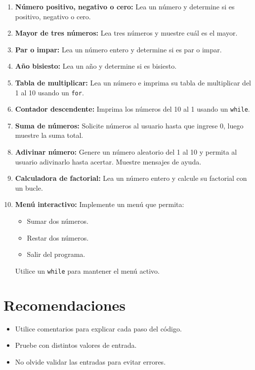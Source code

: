 \documentclass[12pt,a4paper]{article}
\begin{document}
\begin{enumerate}[label=\textbf{Ejercicio \arabic*:}, leftmargin=1.5cm]
    \item \textbf{Número positivo, negativo o cero:} Lea un número y determine si es positivo, negativo o cero.
    
    \item \textbf{Mayor de tres números:} Lea tres números y muestre cuál es el mayor.
    
    \item \textbf{Par o impar:} Lea un número entero y determine si es par o impar.
    
    \item \textbf{Año bisiesto:} Lea un año y determine si es bisiesto.
    
    \item \textbf{Tabla de multiplicar:} Lea un número e imprima su tabla de multiplicar del 1 al 10 usando un \texttt{for}.
    
    \item \textbf{Contador descendente:} Imprima los números del 10 al 1 usando un \texttt{while}.
    
    \item \textbf{Suma de números:} Solicite números al usuario hasta que ingrese 0, luego muestre la suma total.
    
    \item \textbf{Adivinar número:} Genere un número aleatorio del 1 al 10 y permita al usuario adivinarlo hasta acertar. Muestre mensajes de ayuda.
    
    \item \textbf{Calculadora de factorial:} Lea un número entero y calcule su factorial con un bucle.
    
    \item \textbf{Menú interactivo:} Implemente un menú que permita:
    \begin{itemize}
        \item Sumar dos números.
        \item Restar dos números.
        \item Salir del programa.
    \end{itemize}
    Utilice un \texttt{while} para mantener el menú activo.
\end{enumerate}

\section*{Recomendaciones}
\begin{itemize}
    \item Utilice comentarios para explicar cada paso del código.
    \item Pruebe con distintos valores de entrada.
    \item No olvide validar las entradas para evitar errores.
\end{itemize}
\end{document}
